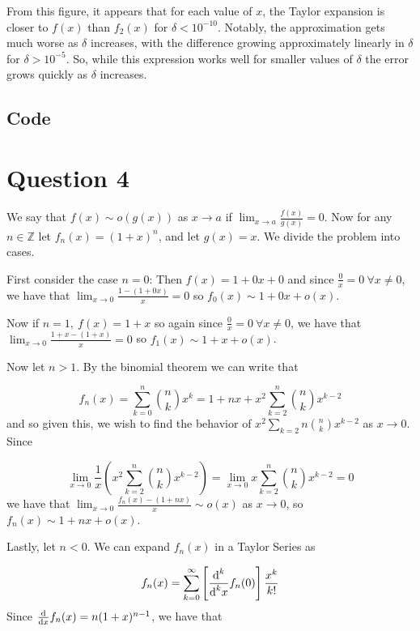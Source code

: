 \documentclass[12pt]{exam}
\newcommand{\diffd}{\textnormal{d}}
\begin{document}
From this figure, it appears that for each value of $x$, the Taylor expansion is closer to $f(x)$ than $f_2(x)$ for $\delta <10^{-10}$. Notably, the approximation gets much worse as $\delta$ increases, with the difference growing approximately linearly in $\delta$ for $\delta > 10^{-5}$. So, while this expression works well for smaller values of $\delta$ the error grows quickly as $\delta$ increases.
\subsection*{Code}


\newpage

\section*{Question 4}

We say that $f(x)\sim o(g(x))$ as $x\rightarrow a$ if $\lim_{x\rightarrow a} \frac{f(x)}{g(x)}=0$. Now for any $n\in \mathbb{Z}$ let $f_n(x)=(1+x)^n$, and let $g(x)=x$. We divide the problem into cases.

 First consider the case $n=0$: Then $f(x) = 1+0x+0$ and since $\frac{0}{x}=0\ \forall x \ne 0$, we have that $\lim_{x\rightarrow 0} \frac{1-(1+0x)}{x}=0$ so $f_0(x)\sim 1+0x+o(x)$.

Now if $n=1,\ f(x)=1+x$ so again since $\frac{0}{x}=0\ \forall x \ne 0$, we have that $\lim_{x\rightarrow 0} \frac{1+x-(1+x)}{x}=0$ so $f_1(x)\sim 1+x+o(x)$.

Now let $n>1$. By the binomial theorem we can write that 

\begin{equation}
f_n(x) = \sum_{k=0}^n {n\choose k} x^k = 1+nx+x^2 \sum_{k=2}^n {n\choose k} x^{k-2} 
\end{equation}
and so given this, we wish to find the behavior of $x^2\sum_{k=2}{n}{n\choose k}x^{k-2}$ as $x\rightarrow 0$. Since

\begin{equation}
\lim_{x\rightarrow 0}\frac{1}{x} \left(x^2\sum_{k=2}^{n}{n\choose k}x^{k-2}\right) =  \lim_{x\rightarrow 0} x\sum_{k=2}^{n}{n\choose k}x^{k-2} =0 
\end{equation}
we have that $\lim_{x\rightarrow 0} \frac{f_n(x)-(1+nx)}{x}\sim o(x)$ as $x\rightarrow 0$, so $f_n(x) \sim 1+nx+o(x)$.

Lastly, let $n<0$. We can expand $f_n(x)$ in a Taylor Series as

\begin{equation}
f_n(x) = \sum_{k=0}^{\infty} \left[\frac{\diffd^k}{\diffd^k x}f_n(0)\right] \frac{x^k}{k!}
\end{equation}
Since $\frac{\diffd}{\diffd x} f_n(x) = n(1+x)^{n-1}$, we have that 
\end{document}
